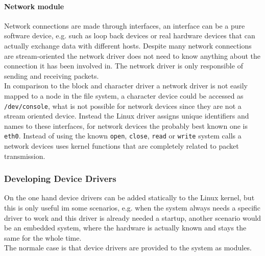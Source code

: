 \documentclass{sig-alternate-05-2015}
\begin{document}
\paragraph{Network module}
Network connections are made through interfaces, an interface can be a pure software device, e.g. such as loop back devices or real hardware devices that can actually exchange data with different hosts. Despite many network connections are stream-oriented the network driver does not need to know anything about the connection it has been involved in. The network driver is only responsible of sending and receiving packets. \\
In comparison to the block and character driver a network driver is not easily mapped to a node in the file system, a character device could be accessed as \texttt{/dev/console}, what is not possible for network devices since they are not a stream oriented device. Instead the Linux driver assigns unique identifiers and names to these interfaces, for network devices the probably best known one is \texttt{eth0}. Instead of using the known \texttt{open}, \texttt{close}, \texttt{read} or \texttt{write} system calls a network devices uses kernel functions that are completely related to packet transmission. 

\subsubsection{Developing Device Drivers}
On the one hand device drivers can be added statically to the Linux kernel, but this is only useful im some scenarios, e.g. when the system always needs a specific driver to work and this driver is already needed a startup, another scenario would be an embedded system, where the hardware is actually known and stays the same for the whole time. \cite{Corbet:2005:LDD:1209083} \\ The normale case is that device drivers are provided to the system as modules.
\end{document}
